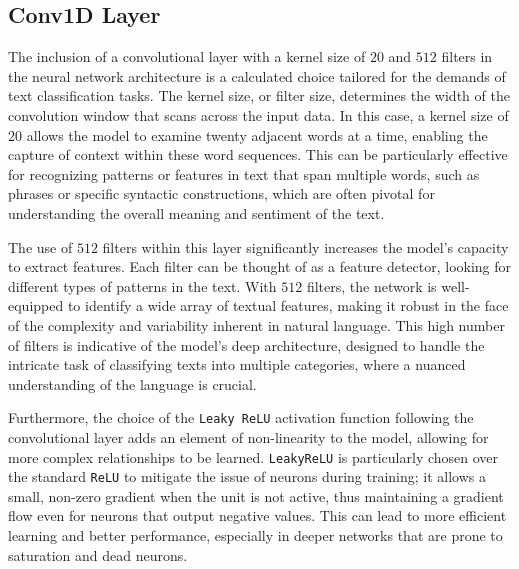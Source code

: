 \subsection{Conv1D Layer}
The inclusion of a convolutional layer with a kernel size of $20$ and $512$ filters in the neural network architecture is a calculated choice tailored for the demands of text classification tasks. The kernel size, or filter size, determines the width of the convolution window that scans across the input data. In this case, a kernel size of $20$ allows the model to examine twenty adjacent words at a time, enabling the capture of context within these word sequences. This can be particularly effective for recognizing patterns or features in text that span multiple words, such as phrases or specific syntactic constructions, which are often pivotal for understanding the overall meaning and sentiment of the text.

The use of $512$ filters within this layer significantly increases the model's capacity to extract features. Each filter can be thought of as a feature detector, looking for different types of patterns in the text. With $512$ filters, the network is well-equipped to identify a wide array of textual features, making it robust in the face of the complexity and variability inherent in natural language. This high number of filters is indicative of the model's deep architecture, designed to handle the intricate task of classifying texts into multiple categories, where a nuanced understanding of the language is crucial.

Furthermore, the choice of the \verb|Leaky ReLU| activation function following the convolutional layer adds an element of non-linearity to the model, allowing for more complex relationships to be learned. \verb|LeakyReLU| is particularly chosen over the standard \verb|ReLU| to mitigate the issue of neurons  during training; it allows a small, non-zero gradient when the unit is not active, thus maintaining a gradient flow even for neurons that output negative values. This can lead to more efficient learning and better performance, especially in deeper networks that are prone to saturation and dead neurons.

